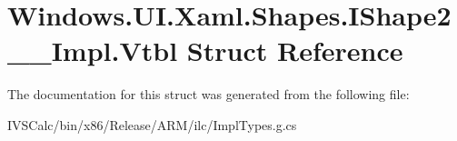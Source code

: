 \hypertarget{struct_windows_1_1_u_i_1_1_xaml_1_1_shapes_1_1_i_shape2_____impl_1_1_vtbl}{}\section{Windows.\+U\+I.\+Xaml.\+Shapes.\+I\+Shape2\+\_\+\+\_\+\+Impl.\+Vtbl Struct Reference}
\label{struct_windows_1_1_u_i_1_1_xaml_1_1_shapes_1_1_i_shape2_____impl_1_1_vtbl}


The documentation for this struct was generated from the following file\+:\begin{DoxyCompactItemize}
\item 
I\+V\+S\+Calc/bin/x86/\+Release/\+A\+R\+M/ilc/Impl\+Types.\+g.\+cs\end{DoxyCompactItemize}
